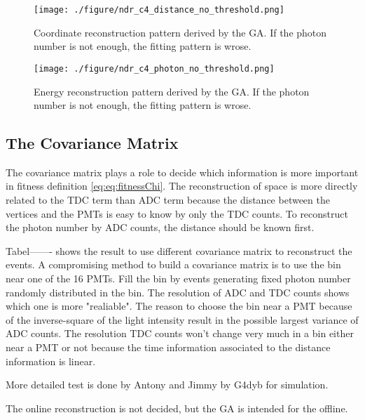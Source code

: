 \begin{figure}[h]
    \centering
    \texttt{[image: ./figure/ndr\_c4\_distance\_no\_threshold.png]}
    \caption[Coordinate reconstruction without threshold]
{
Coordinate reconstruction pattern derived by the GA.
If the photon number is not enough, the fitting pattern is wrose.
}
    \label{fig:ndr_c4_distance_no_threshold.png}
    \end{figure}



\begin{figure}[h]
    \centering
    \texttt{[image: ./figure/ndr\_c4\_photon\_no\_threshold.png]}
    \caption[Energy reconstruction without threshold]
{
Energy reconstruction pattern derived by the GA.
If the photon number is not enough, the fitting pattern is wrose.
}
    \label{fig:ndr_c4_photon_no_threshold.png}
    \end{figure}


\subsection{The Covariance Matrix}

The covariance matrix plays a role to decide which information is more important in fitness definition \ref{eq:eq:fitnessChi}.
The reconstruction of space is more directly related to the TDC term than ADC term
because the distance between the vertices and the PMTs is easy to know by only the TDC counts.
To reconstruct the photon number by ADC counts, the distance should be known first.

Tabel------- shows the result to use different covariance matrix to reconstruct the events.
A compromising method to build a covariance matrix is to use the bin near one of the 16 PMTs.
Fill the bin by events generating fixed photon number randomly distributed in the bin.
The resolution of ADC and TDC counts shows which one is more "realiable".
The reason to choose the bin near a PMT because of the inverse-square of the light intensity
result in the possible largest variance of ADC counts. The resolution TDC counts won't change
very much in a bin either near a PMT or not because the time information associated to the
distance information is linear.

















More detailed test is done by Antony and Jimmy by G4dyb for simulation.



The online reconstruction is not decided, but the GA is intended for
the offline.

